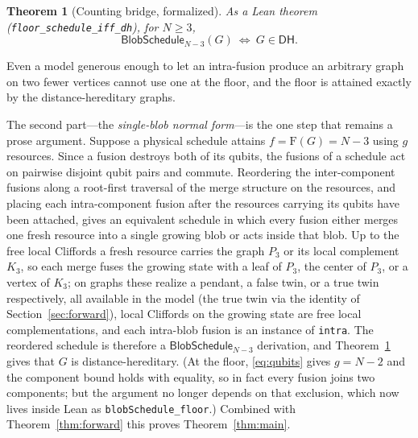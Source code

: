 \documentclass[11pt]{article}
\newtheorem{theorem}{Theorem}
\theoremstyle{definition}
\theoremstyle{remark}
\newcommand{\F}{\mathrm{F}}
\newcommand{\N}{N}
\newcommand{\code}[1]{\texttt{#1}}
\begin{document}
\begin{theorem}[Counting bridge, formalized]\label{thm:bridge}
As a Lean theorem (\code{floor\_schedule\_iff\_dh}), for $\N\ge 3$,
\[
  \mathsf{BlobSchedule}_{\N-3}(G)\ \Longleftrightarrow\ G\in\mathsf{DH}.
\]
\end{theorem}

Even a model generous enough to let an intra-fusion produce an arbitrary graph on two fewer
vertices cannot use one at the floor, and the floor is attained exactly by the distance-hereditary
graphs.

The second part---the \emph{single-blob normal form}---is the one step that remains a prose
argument. Suppose a physical schedule attains $f=\F(G)=\N-3$ using $g$ resources. Since a fusion
destroys both of its qubits, the fusions of a schedule act on pairwise disjoint qubit pairs and
commute. Reordering the inter-component fusions along a root-first traversal of the merge structure
on the resources, and placing each intra-component fusion after the resources carrying its qubits
have been attached, gives an equivalent schedule in which every fusion either merges one fresh
resource into a single growing blob or acts inside that blob. Up to the free local Cliffords a
fresh resource carries the graph $P_3$ or its local complement $K_3$, so each merge fuses the
growing state with a leaf of $P_3$, the center of $P_3$, or a vertex of $K_3$; on graphs these
realize a pendant, a false twin, or a true twin respectively, all available in the model (the true
twin via the identity of Section~\ref{sec:forward}), local Cliffords on the growing state are free
local complementations, and each intra-blob fusion is an instance of \code{intra}. The reordered
schedule is therefore a $\mathsf{BlobSchedule}_{\N-3}$ derivation, and Theorem~\ref{thm:bridge}
gives that $G$ is distance-hereditary. (At the floor, \eqref{eq:qubits} gives $g=\N-2$ and the
component bound holds with equality, so in fact every fusion joins two components; but the argument
no longer depends on that exclusion, which now lives inside Lean as \code{blobSchedule\_floor}.)
Combined with Theorem~\ref{thm:forward} this proves Theorem~\ref{thm:main}.
\end{document}
